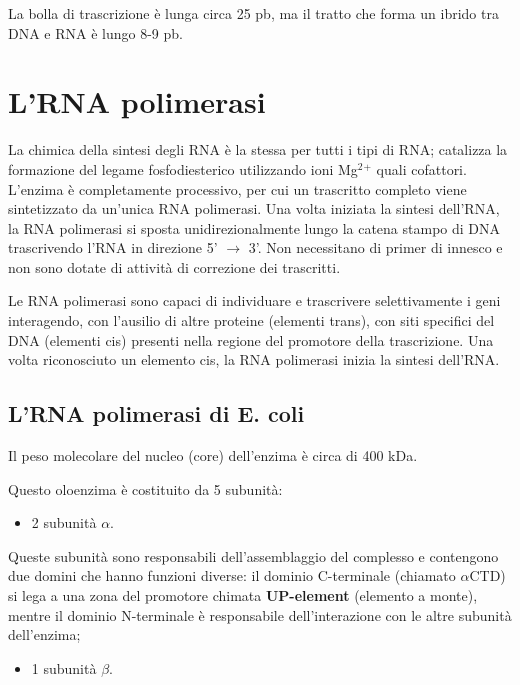 \documentclass[11pt]{book}
\begin{document}
La bolla di trascrizione è lunga circa 25 pb, ma il tratto che forma un
ibrido tra DNA e RNA è lungo 8-9 pb.

\section{L'RNA polimerasi}\label{lrna-polimerasi}

La chimica della sintesi degli RNA è la stessa per tutti i tipi di RNA;
catalizza la formazione del legame fosfodiesterico utilizzando ioni
Mg\(^2\)\(^+\) quali cofattori. L'enzima è completamente processivo, per
cui un trascritto completo viene sintetizzato da un'unica RNA
polimerasi. Una volta iniziata la sintesi dell'RNA, la RNA polimerasi si
sposta unidirezionalmente lungo la catena stampo di DNA trascrivendo
l'RNA in direzione 5' \(\rightarrow\) 3'. Non necessitano di primer di
innesco e non sono dotate di attività di correzione dei trascritti.

Le RNA polimerasi sono capaci di individuare e trascrivere
selettivamente i geni interagendo, con l'ausilio di altre proteine
(elementi trans), con siti specifici del DNA (elementi cis) presenti
nella regione del promotore della trascrizione. Una volta riconosciuto
un elemento cis, la RNA polimerasi inizia la sintesi dell'RNA.

\subsection{L'RNA polimerasi di E.
coli}\label{lrna-polimerasi-di-e.-coli}

Il peso molecolare del nucleo (core) dell'enzima è circa di 400 kDa.

Questo oloenzima è costituito da 5 subunità:

\begin{itemize}
\itemsep1pt\parskip0pt
\item
  2 subunità \textbf{\(\alpha\)}.
\end{itemize}

Queste subunità sono responsabili dell'assemblaggio del complesso e
contengono due domini che hanno funzioni diverse: il dominio C-terminale
(chiamato \(\alpha\)CTD) si lega a una zona del promotore chimata
\textbf{UP-element} (elemento a monte), mentre il dominio N-terminale è
responsabile dell'interazione con le altre subunità dell'enzima;

\begin{itemize}
\itemsep1pt\parskip0pt
\item
  1 subunità \textbf{\(\beta\)}.
\end{itemize}
\end{document}
